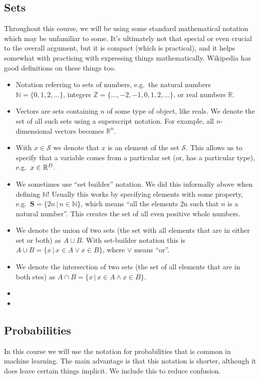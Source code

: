 \documentclass[a4paper]{article}
\theoremstyle{definition}
\begin{document}
\subsection{Sets}
Throughout this course, we will be using some standard mathematical notation which may be unfamiliar to some. It's ultimately not that special or even crucial to the overall argument, but it is compact (which is practical), and it helps somewhat with practising with expressing things mathematically. Wikipedia has good definitions on these things too.
\begin{itemize}
\item Notation referring to sets of numbers, e.g.~the natural numbers $\mathbb N = \{0, 1, 2, \dots\}$, integers $\mathbb Z = \{\dots, -2, -1, 0, 1, 2, \dots\}$, or real numbers $\mathbb R$.
\item Vectors are sets containing $n$ of some type of object, like reals. We denote the set of all such sets using a superscript notation. For example, all $n$-dimensional vectors becomes $\mathbb R^n$.
\item With $x \in \mathcal S$ we denote that $x$ is an element of the set $\mathcal S$. This allows us to specify that a variable comes from a particular set (or, has a particular type), e.g.~$x \in \mathbb{R}^D$.
\item We sometimes use ``set builder'' notation. We did this informally above when defining $\mathbb N$! Usually this works by specifying elements with some property, e.g.~$\mathbf S = \{2n \,|\, n \in \mathbb N\}$, which means ``all the elements 2n such that $n$ is a natural number''. This creates the set of all even positive whole numbers.
\item We denote the union of two sets (the set with all elements that are in either set or both) as $A \cup B$. With set-builder notation this is $A \cup B = \{x\,|\,x\in A \vee x\in B\}$, where $\vee$ means ``or''.
\item We denote the intersection of two sets (the set of all elements that are in both stes) as $A \cap B = \{x\,|\,x\in A \wedge x\in B\}$.
\item {}
\item {}
\end{itemize}

\subsection{Probabilities}
In this course we will use the notation for probabilities that is common in machine learning. The main advantage is that this notation is shorter, although it does leave certain things implicit. We include this to reduce confusion.
\end{document}
